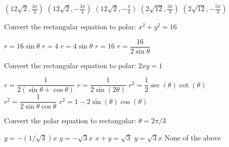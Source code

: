 \documentclass[11pt,answers]{exam}
\begin{document}
\begin{questions}
\begin{minipage}{\linewidth}
\begin{choices}
	\choice $\left(12 \sqrt{2},\frac{3 \pi }{4}\right)$
	\CorrectChoice $\left(12 \sqrt{2},-\frac{3 \pi }{4}\right)$
	\choice $\left(12 \sqrt{2},-\frac{\pi }{4}\right)$
	\choice $\left(2 \sqrt{12},\frac{3 \pi }{4}\right)$
	\choice $\left(2 \sqrt{12},-\frac{5 \pi }{4}\right)$
\end{choices} \answerline

\end{minipage}

\begin{minipage}{\linewidth}



\question Convert the rectangular equation to polar: $x^2 + y^2 = 16$

\begin{choices}
	\choice $r = 16 \sin \theta$
	\CorrectChoice $r = 4$
	\choice $r = 4 \sin \theta$
	\choice $r=16$
	\choice $r = \dfrac{16}{2\sin\theta}$
\end{choices} \answerline
\end{minipage}

\begin{minipage}{\linewidth}



\question Convert the rectangular equation to polar: $2xy=1$

\begin{choices}
	\choice $r = \dfrac{1}{2(\sin\theta + \cos\theta)}$
	\choice $r = \dfrac{1}{2\sin(2\theta)}$
	\choice $r^2 = \dfrac{1}{2}\sec(\theta)\cot(\theta)$
	\CorrectChoice $r^2 = \dfrac{1}{2\sin\theta\cos\theta}$
	\choice $r^2 = 1 - 2\sin(\theta)\cos(\theta)$
\end{choices} \answerline
\end{minipage}

\begin{minipage}{\linewidth}


\question Convert the polar equation to rectangular: $\theta = 2\pi/3$

\begin{choices}
	\choice $y = -(1/\sqrt3) x$
	\correctchoice $y = -\sqrt3 x$
	\choice $x+y = \sqrt3$
	\choice $y = \sqrt3 x$
	\choice None of the above
\end{choices} \answerline


\end{minipage}

\begin{minipage}{\linewidth}



\end{minipage}
\end{questions}
\end{document}
